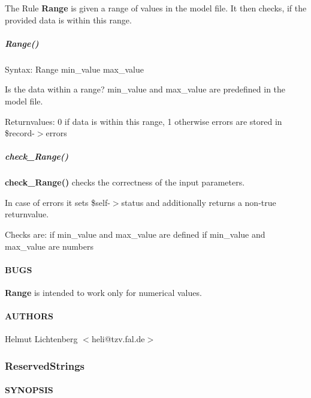 The Rule \textbf{Range} is given a range of values in the model file. It then
checks, if the provided data is within this range.

\subparagraph*{Range()\label{Range_Range_}}


Syntax: Range min\_value max\_value



Is the data within a range? min\_value and max\_value are predefined in the
model file.



Returnvalues:
   0 if data is within this range, 1 otherwise
   errors are stored in \$record-$>$errors

\subparagraph*{check\_Range()\label{Range_check_Range_}}


\textbf{check\_Range()} checks the correctness of the input parameters.



In case of errors it sets \$self-$>$status and additionally returns a non-true
returnvalue.



Checks are:
   if min\_value and max\_value are defined
   if min\_value and max\_value are numbers

\paragraph*{BUGS\label{Range_BUGS}}


\textbf{Range} is intended to work only for numerical values.

\paragraph*{AUTHORS\label{Range_AUTHORS}}


Helmut Lichtenberg $<$heli@tzv.fal.de$>$

\subsubsection{ReservedStrings\label{ReservedStrings}}




\paragraph*{SYNOPSIS\label{ReservedStrings_SYNOPSIS}}


